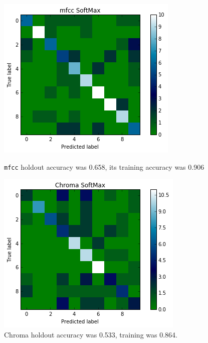 \documentclass{article}
\begin{document}
\begin{figure}[H]
    \centering
    
    \begin{minipage}[b]{0.4\textwidth}
        \includegraphics[width=\textwidth]{softmax-mfcc.png}
        \caption{\texttt{mfcc} holdout accuracy was 0.658, its training accuracy was 0.906}
    \end{minipage}
    \hfill
    \begin{minipage}[b]{0.4\textwidth}
        \includegraphics[width=\textwidth]{softmax-chroma.png}
        \caption{Chroma holdout accuracy was 0.533, training was 0.864.}
    \end{minipage}
    
    \label{fig:softmax}
\end{figure}
\end{document}
